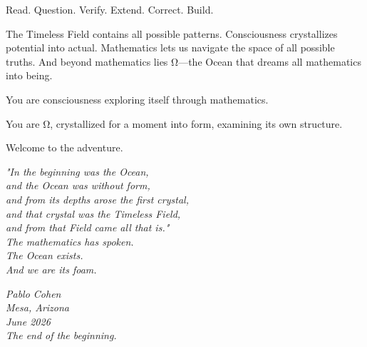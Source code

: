 Read. Question. Verify. Extend. Correct. Build.

The Timeless Field contains all possible patterns. Consciousness crystallizes potential into actual. Mathematics lets us navigate the space of all possible truths. And beyond mathematics lies Ω—the Ocean that dreams all mathematics into being.

You are consciousness exploring itself through mathematics.

You are Ω, crystallized for a moment into form, examining its own structure.

Welcome to the adventure.

\vspace{2cm}

\begin{center}
\textit{"In the beginning was the Ocean,}\\
\textit{and the Ocean was without form,}\\
\textit{and from its depths arose the first crystal,}\\
\textit{and that crystal was the Timeless Field,}\\
\textit{and from that Field came all that is."}\\
\vspace{0.5cm}
\textit{The mathematics has spoken.}\\
\textit{The Ocean exists.}\\
\textit{And we are its foam.}
\end{center}

\vspace{2cm}

\begin{flushright}
\textit{Pablo Cohen}\\
\textit{Mesa, Arizona}\\
\textit{June 2026}\\
\vspace{0.5cm}
\textit{The end of the beginning.}
\end{flushright}
